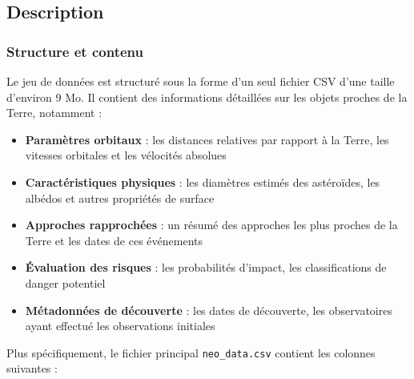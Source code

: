 \documentclass[11pt]{article}
\providecommand{\tightlist}{%
      \setlength{\itemsep}{0pt}\setlength{\parskip}{0pt}}
\begin{document}
\subsection{Description}\label{description}

\subsubsection{Structure et contenu}\label{structure-et-contenu}

Le jeu de données est structuré sous la forme d'un seul fichier CSV
d'une taille d'environ 9 Mo. Il contient des informations détaillées sur
les objets proches de la Terre, notamment :

\begin{itemize}
  \tightlist
  \item
        \textbf{Paramètres orbitaux} : les distances relatives par rapport à
        la Terre, les vitesses orbitales et les vélocités absolues
  \item
        \textbf{Caractéristiques physiques} : les diamètres estimés des
        astéroïdes, les albédos et autres propriétés de surface
  \item
        \textbf{Approches rapprochées} : un résumé des approches les plus
        proches de la Terre et les dates de ces événements
  \item
        \textbf{Évaluation des risques} : les probabilités d'impact, les
        classifications de danger potentiel
  \item
        \textbf{Métadonnées de découverte} : les dates de découverte, les
        observatoires ayant effectué les observations initiales
\end{itemize}

Plus spécifiquement, le fichier principal \texttt{neo\_data.csv}
contient les colonnes suivantes :
\end{document}
